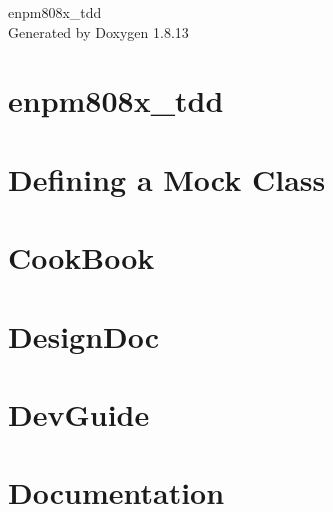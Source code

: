 \documentclass[twoside]{book}
\newcommand{\+}{\discretionary{\mbox{\scriptsize$\hookleftarrow$}}{}{}}
\newcommand{\clearemptydoublepage}{%
  \newpage{\pagestyle{empty}\cleardoublepage}%
}
\begin{document}
\hypersetup{pageanchor=false,
             bookmarksnumbered=true,
             pdfencoding=unicode
            }
\begin{titlepage}
\vspace*{7cm}
\begin{center}%
{\Large enpm808x\+\_\+tdd }\\
\vspace*{1cm}
{\large Generated by Doxygen 1.8.13}\\
\end{center}
\end{titlepage}
\clearemptydoublepage
{}
\tableofcontents
\clearemptydoublepage
{}
\hypersetup{pageanchor=true}

\chapter{enpm808x\+\_\+tdd}
\label{md_readme}

\chapter{Defining a Mock Class}
\label{md_vendor_googletest_googlemock_docs__cheat_sheet}

\chapter{Cook\+Book}
\label{md_vendor_googletest_googlemock_docs__cook_book}

\chapter{Design\+Doc}
\label{md_vendor_googletest_googlemock_docs__design_doc}

\chapter{Dev\+Guide}
\label{md_vendor_googletest_googlemock_docs__dev_guide}

\chapter{Documentation}
\label{md_vendor_googletest_googlemock_docs__documentation}

\end{document}
